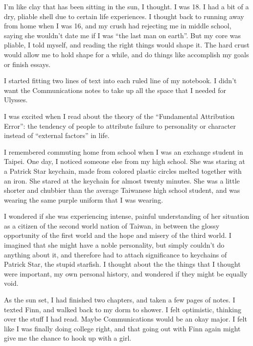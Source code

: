 I'm like clay that has been sitting in the sun, I thought.  I was 18.  I had a
bit of a dry, pliable shell due to certain life experiences.  I thought back to
running away from home when I was 16, and my crush had rejecting me in middle
school, saying she wouldn't date me if I was ``the last man on earth''.  But my
core was pliable, I told myself, and reading the right things would shape it.
The hard crust  would allow me to hold shape for a while, and do things like
accomplish my goals or finish essays.

I started fitting two lines of text into each ruled line of my
notebook.  I didn't want the Communications notes to take up all the space that
I needed for Ulysses.  

I was excited when I read about the theory of the ``Fundamental Attribution
Error'': the tendency of people to attribute failure to personality or character
instead of ``external factors'' in life. 

I remembered commuting home from school when I was an exchange student in
Taipei.  One day, I noticed someone else from my high school.  She was staring
at a Patrick Star keychain, made from colored plastic circles melted together
with an iron.  She stared at the keychain for almost twenty minutes.  She was a
little shorter and chubbier than the average Taiwanese high school student, and
was wearing the same purple uniform that I was wearing.

I wondered if she was experiencing intense, painful understanding of her
situation as a citizen of the second world nation of Taiwan, in between the
glossy opportunity of the first world and the hope and misery of the third
world.  I imagined that she might have a noble personality, but simply couldn't
do anything about it, and therefore had to attach significance to keychains of
Patrick Star, the stupid starfish.  I thought about the the things that I
thought were important, my own personal history, and wondered if they might be
equally void.

As the sun set, I had finished two chapters, and taken a few pages of notes.  I
texted Finn, and walked back to my dorm to shower.  I felt optimistic, thinking
over the stuff I had read.  Maybe Communications would be an okay major.  I felt
like I was finally doing college right, and that going out with Finn again might
give me the chance to hook up with a girl.

\section{}

